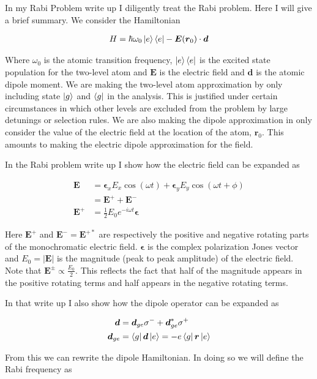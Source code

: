 \documentclass[12pt]{article}
\newcommand{\bv}[1]{\boldsymbol{#1}}
\begin{document}
In my Rabi Problem write up I diligently treat the Rabi problem. Here I will give a brief summary. We consider the Hamiltonian

\begin{align}
H = \hbar \omega_0 \ket{e}\bra{e} - \bv{E}(\bv{r}_0)\cdot \bv{d}
\end{align}

Where $\omega_0$ is the atomic transition frequency, $\ket{e}\bra{e}$ is the excited state population for the two-level atom and $\bv{E}$ is the electric field and $\bv{d}$ is the atomic dipole moment. We are making the two-level atom approximation by only including state $\ket{g}$ and $\bra{g}$ in the analysis. This is justified under certain circumstances in which other levels are excluded from the problem by large detunings or selection rules. We are also making the dipole approximation in only consider the value of the electric field at the location of the atom, $\bv{r}_0$. This amounts to making the electric dipole approximation for the field.

In the Rabi problem write up I show how the electric field can be expanded as

\begin{align}
\bv{E} &= \bv{\epsilon}_x E_x \cos(\omega t) + \bv{\epsilon}_y E_y \cos(\omega t + \phi)\\
&=\bv{E}^+ + \bv{E}^-\\
\bv{E}^+ &= \frac{1}{2} E_0 e^{-i\omega t}\bv{\epsilon}
\end{align}

Here $\bv{E}^+$ and $\bv{E}^-=\bv{E}^{+*}$ are respectively the positive and negative rotating parts of the monochromatic electric field. $\bv{\epsilon}$ is the complex polarization Jones vector and $E_0 = |\bv{E}|$ is the magnitude (peak to peak amplitude) of the electric field. Note that $\bv{E}^{\pm} \propto \frac{E_0}{2}$. This reflects the fact that half of the magnitude appears in the positive rotating terms and half appears in the negative rotating terms. 

In that write up I also show how the dipole operator can be expanded as

\begin{align}
\bv{d} &= \bv{d}_{ge} \sigma^- + \bv{d}_{ge}^* \sigma^+\\
\bv{d}_{ge} &= \bra{g}\bv{d}\ket{e} = -e\bra{g}\bv{r}\ket{e}
\end{align}

From this we can rewrite the dipole Hamiltonian. In doing so we will define the Rabi frequency as
\end{document}
